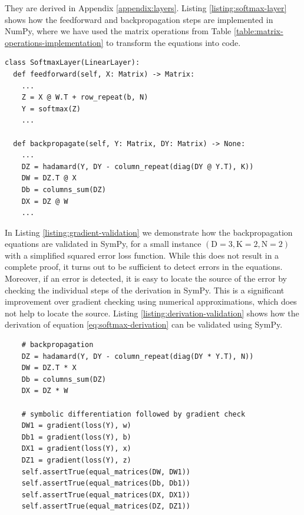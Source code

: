 \documentclass[twoside,11pt]{article}
\newcommand{\const}[1]{\ensuremath{\mathrm{#1}}} %
\begin{document}
They are derived in Appendix \ref{appendix:layers}.
Listing \ref{listing:softmax-layer} shows how the feedforward and backpropagation steps are implemented in NumPy, where we have used the matrix operations from Table \ref{table:matrix-operations-implementation} to transform the equations into code.
\begin{lstfloat}[!ht]
\begin{lstlisting}
class SoftmaxLayer(LinearLayer):
  def feedforward(self, X: Matrix) -> Matrix:
    ...
    Z = X @ W.T + row_repeat(b, N)
    Y = softmax(Z)
    ...

  def backpropagate(self, Y: Matrix, DY: Matrix) -> None:
    ...
    DZ = hadamard(Y, DY - column_repeat(diag(DY @ Y.T), K))
    DW = DZ.T @ X
    Db = columns_sum(DZ)
    DX = DZ @ W
    ...
\end{lstlisting}
\caption{Softmax layer implementation in NumPy. We use Table \ref{table:matrix-operations-implementation} to transform equations \ref{eq:softmax-layer-feedforward}, \ref{eq:softmax-layer-backprop1} and \ref{eq:softmax-layer-backprop2} into code.  }
\label{listing:softmax-layer}
\end{lstfloat}
In Listing \ref{listing:gradient-validation} we demonstrate how the backpropagation equations are validated in SymPy, for a small instance $(\const{D} = 3, \const{K} = 2, \const{N} = 2)$ with a simplified squared error loss function. While this does not result in a complete proof, it turns out to be sufficient to detect errors in the equations. Moreover, if an error is detected, it is easy to locate the source of the error by checking the individual steps of the derivation in SymPy. This is a significant improvement over gradient checking using numerical approximations, which does not help to locate the source.
Listing \ref{listing:derivation-validation} shows how the derivation of equation \ref{eq:softmax-derivation} can be validated using SymPy.
\begin{lstfloat}[!ht]
\begin{lstlisting}
    # backpropagation
    DZ = hadamard(Y, DY - column_repeat(diag(DY * Y.T), N))
    DW = DZ.T * X
    Db = columns_sum(DZ)
    DX = DZ * W

    # symbolic differentiation followed by gradient check
    DW1 = gradient(loss(Y), w)
    Db1 = gradient(loss(Y), b)
    DX1 = gradient(loss(Y), x)
    DZ1 = gradient(loss(Y), z)
    self.assertTrue(equal_matrices(DW, DW1))
    self.assertTrue(equal_matrices(Db, Db1))
    self.assertTrue(equal_matrices(DX, DX1))
    self.assertTrue(equal_matrices(DZ, DZ1))
\end{lstlisting}
\caption{Validating gradients in SymPy using symbolic differentiation. The function \texttt{gradient} computes the gradient of a matrix expression (of dimension $1\times 1$ in case of the loss) with respect to a vector of variables, and is implemented using the SymPy symbolic differentiation operator \texttt{diff}. The variables
\texttt{w}, \texttt{b}, \texttt{x}, and \texttt{z} contain the elements of
$W$, $b$, $X$ and $Z$ in equation \ref{eq:softmax-layer-feedforward}.
The function \texttt{equal\_matrices} checks equality of two matrices using the function
\texttt{sympy.simplify}.
}
\label{listing:gradient-validation}
\end{lstfloat}
\end{document}
